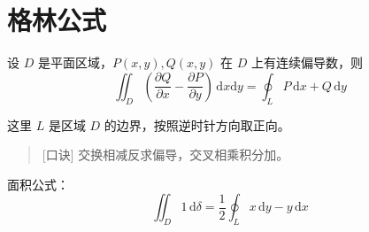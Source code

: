 \section{格林公式}

\begin{theorem}
    设 $D$ 是平面区域，$P(x,y),Q(x,y)$ 在 $D$ 上有连续偏导数，则
    \[
        \iint_{D} \left( \frac{\partial Q}{\partial x} - \frac{\partial P}{\partial y} \right) \, \mathrm{d}x \mathrm{d}y = \oint_{L} P \, \mathrm{d}x + Q \, \mathrm{d}y
    \]
\end{theorem}

这里 $L$ 是区域 $D$ 的边界，按照逆时针方向取正向。

\begin{quote}[口诀]
    交换相减反求偏导，交叉相乘积分加。
\end{quote}

面积公式：
\[
    \iint_{D} 1 \, \mathrm{d}\delta = \frac{1}{2} \oint_{L} x \, \mathrm{d}y - y \, \mathrm{d}x
\]